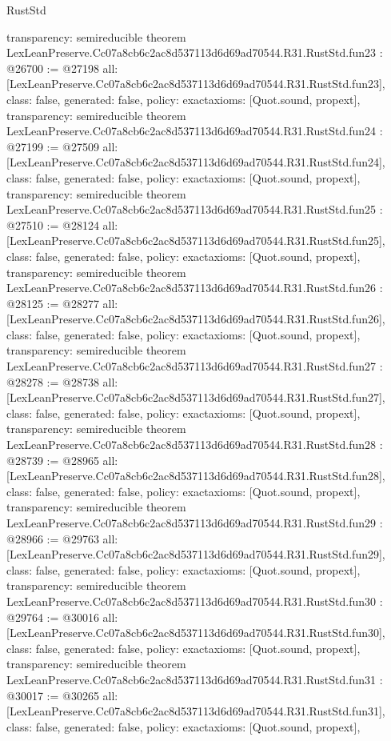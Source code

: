 \begin{lexlean}{RustStd}
\begin{coremodule}
{  transparency: semireducible
}
theorem LexLeanPreserve.Cc07a8cb6c2ac8d537113d6d69ad70544.R31.RustStd.fun23 : @26700 := @27198 {
  all: [LexLeanPreserve.Cc07a8cb6c2ac8d537113d6d69ad70544.R31.RustStd.fun23],
  class: false,
  generated: false,
  policy: exact{axioms: [Quot.sound, propext]},
  transparency: semireducible
}
theorem LexLeanPreserve.Cc07a8cb6c2ac8d537113d6d69ad70544.R31.RustStd.fun24 : @27199 := @27509 {
  all: [LexLeanPreserve.Cc07a8cb6c2ac8d537113d6d69ad70544.R31.RustStd.fun24],
  class: false,
  generated: false,
  policy: exact{axioms: [Quot.sound, propext]},
  transparency: semireducible
}
theorem LexLeanPreserve.Cc07a8cb6c2ac8d537113d6d69ad70544.R31.RustStd.fun25 : @27510 := @28124 {
  all: [LexLeanPreserve.Cc07a8cb6c2ac8d537113d6d69ad70544.R31.RustStd.fun25],
  class: false,
  generated: false,
  policy: exact{axioms: [Quot.sound, propext]},
  transparency: semireducible
}
theorem LexLeanPreserve.Cc07a8cb6c2ac8d537113d6d69ad70544.R31.RustStd.fun26 : @28125 := @28277 {
  all: [LexLeanPreserve.Cc07a8cb6c2ac8d537113d6d69ad70544.R31.RustStd.fun26],
  class: false,
  generated: false,
  policy: exact{axioms: [Quot.sound, propext]},
  transparency: semireducible
}
theorem LexLeanPreserve.Cc07a8cb6c2ac8d537113d6d69ad70544.R31.RustStd.fun27 : @28278 := @28738 {
  all: [LexLeanPreserve.Cc07a8cb6c2ac8d537113d6d69ad70544.R31.RustStd.fun27],
  class: false,
  generated: false,
  policy: exact{axioms: [Quot.sound, propext]},
  transparency: semireducible
}
theorem LexLeanPreserve.Cc07a8cb6c2ac8d537113d6d69ad70544.R31.RustStd.fun28 : @28739 := @28965 {
  all: [LexLeanPreserve.Cc07a8cb6c2ac8d537113d6d69ad70544.R31.RustStd.fun28],
  class: false,
  generated: false,
  policy: exact{axioms: [Quot.sound, propext]},
  transparency: semireducible
}
theorem LexLeanPreserve.Cc07a8cb6c2ac8d537113d6d69ad70544.R31.RustStd.fun29 : @28966 := @29763 {
  all: [LexLeanPreserve.Cc07a8cb6c2ac8d537113d6d69ad70544.R31.RustStd.fun29],
  class: false,
  generated: false,
  policy: exact{axioms: [Quot.sound, propext]},
  transparency: semireducible
}
theorem LexLeanPreserve.Cc07a8cb6c2ac8d537113d6d69ad70544.R31.RustStd.fun30 : @29764 := @30016 {
  all: [LexLeanPreserve.Cc07a8cb6c2ac8d537113d6d69ad70544.R31.RustStd.fun30],
  class: false,
  generated: false,
  policy: exact{axioms: [Quot.sound, propext]},
  transparency: semireducible
}
theorem LexLeanPreserve.Cc07a8cb6c2ac8d537113d6d69ad70544.R31.RustStd.fun31 : @30017 := @30265 {
  all: [LexLeanPreserve.Cc07a8cb6c2ac8d537113d6d69ad70544.R31.RustStd.fun31],
  class: false,
  generated: false,
  policy: exact{axioms: [Quot.sound, propext]},
}
\end{coremodule}
\end{lexlean}

